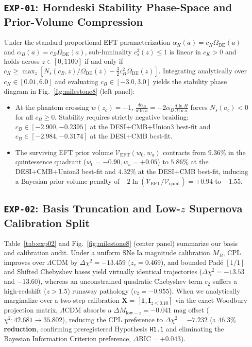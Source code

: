 \documentclass[11pt,a4paper]{article}
\begin{document}
\subsection{\texttt{EXP-01}: Horndeski Stability Phase-Space and Prior-Volume Compression}
Under the standard proportional EFT parameterization $\alpha_K(a) = c_K \Omega_{\mathrm{DE}}(a)$ and $\alpha_B(a) = c_B \Omega_{\mathrm{DE}}(a)$, sub-luminality $c_s^2(z) \le 1$ is linear in $c_K > 0$ and holds across $z \in [0, 1100]$ if and only if $c_K \ge \max_z [N_s(c_B, z)/\Omega_{\mathrm{DE}}(z) - \frac{3}{2}c_B^2 \Omega_{\mathrm{DE}}(z)]$. Integrating analytically over $c_K \in [0.01, 6.0]$ and evaluating $c_B \in [-3.0, 3.0]$ yields the stability phase diagram in Fig.~\ref{fig:milestone8} (left panel):
\begin{itemize}
    \item At the phantom crossing $w(z_c) = -1$, $\frac{d\alpha_B}{d\ln a} = -2\alpha_B \frac{d\ln H}{d\ln a}$ forces $N_s(a_c) < 0$ for all $c_B \ge 0$. Stability requires strictly negative braiding: $c_B \in [-2.900, -0.2395]$ at the DESI+CMB+Union3 best-fit and $c_B \in [-2.984, -0.3174]$ at the DESI+CMB best-fit.
    \item The surviving EFT prior volume $\mathcal{V}_{\mathrm{EFT}}(w_0, w_a)$ contracts from $9.36\%$ in the quintessence quadrant ($w_0 = -0.90, w_a = +0.05$) to $5.86\%$ at the DESI+CMB+Union3 best-fit and $4.32\%$ at the DESI+CMB best-fit, inducing a Bayesian prior-volume penalty of $-2\ln(\mathcal{V}_{\mathrm{EFT}}/\mathcal{V}_{\mathrm{quint}}) = +0.94$ to $+1.55$.
\end{itemize}

\subsection{\texttt{EXP-02}: Basis Truncation and Low-$z$ Supernova Calibration Split}
Table~\ref{tab:exp02} and Fig.~\ref{fig:milestone8} (center panel) summarize our basis and calibration audit. Under a uniform SNe Ia magnitude calibration $M_B$, CPL improves over $\Lambda$CDM by $\Delta\chi^2 = -13.459$ ($z_c = 0.469$), and bounded Pad\'e $[1/1]$ and Shifted Chebyshev bases yield virtually identical trajectories ($\Delta\chi^2 = -13.53$ and $-13.60$), whereas an unconstrained quadratic Chebyshev term $c_2$ suffers a high-redshift ($z > 1.5$) runaway pathology ($c_2 = -0.955$). When we analytically marginalize over a two-step calibration $\mathbf{X} = [\mathbf{1}, \mathbf{I}_{z \le 0.10}]$ via the exact Woodbury projection matrix, $\Lambda$CDM absorbs a $\Delta M_{\mathrm{low-}z} = -0.041\text{ mag}$ offset ($\chi^2: 42.681 \to 35.802$), reducing the CPL preference to $\Delta\chi^2 = -7.232$ (a \textbf{$46.3\%$ reduction}, confirming preregistered Hypothesis \texttt{H1.1} and eliminating the Bayesian Information Criterion preference, $\Delta\mathrm{BIC} = +0.043$).
\end{document}
